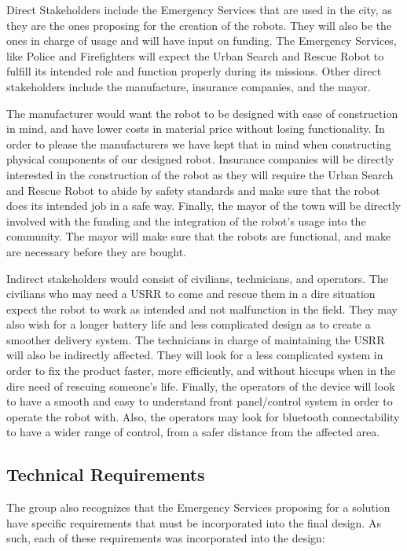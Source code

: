 \documentclass{article}
\begin{document}
    Direct Stakeholders include the Emergency Services that are used in the city, as they are the ones proposing for the creation of the robots. They will also be the ones in charge of usage and will have input on funding. The Emergency Services, like Police and Firefighters will expect the Urban Search and Rescue Robot to fulfill its intended role and function properly during its missions. Other direct stakeholders include the manufacture, insurance companies, and the mayor. 
    
    The manufacturer would want the robot to be designed with ease of construction in mind, and have lower costs in material price without losing functionality. In order to please the manufacturers we have kept that in mind when constructing physical components of our designed robot. Insurance companies will be directly interested in the construction of the robot as they will require the Urban Search and Rescue Robot to abide by safety standards and make sure that the robot does its intended job in a safe way. Finally, the mayor of the town will be directly involved with the funding and the integration of the robot's usage into the community. The mayor will make sure that the robots are functional, and make are necessary before they are bought.
    
    Indirect stakeholders would consist of civilians, technicians, and operators. The civilians who may need a USRR to come and rescue them in a dire situation expect the robot to work as intended and not malfunction in the field. They may also wish for a longer battery life and less complicated design as to create a smoother delivery system. The technicians in charge of maintaining the USRR will also be indirectly affected. They will look for a less complicated system in order to fix the product faster, more efficiently, and without hiccups when in the dire need of rescuing someone's life. Finally, the operators of the device will look to have a smooth and easy to understand front panel/control system in order to operate the robot with. Also, the operators may look for bluetooth connectability to have a wider range of control, from a safer distance from the affected area.
    
\subsection{Technical Requirements}
    The group also recognizes that the Emergency Services proposing for a solution have specific requirements that must be incorporated into the final design. As such, each of these requirements was incorporated into the design:
    
\end{document}
